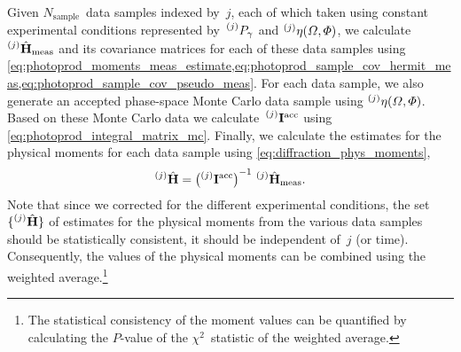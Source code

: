 Given $N_\text{sample}$~data samples indexed by~$j$, each of which
taken using constant experimental conditions represented
by~$\prescript{(j)}{}{P_\gamma}$ and $\prescript{(j)}{}{\eta}(\Omega,
\Phi)$, we calculate
$\prescript{(j)}{}{\vphantom{\vect{H}}}\hat{\vect{H}}_\text{meas}$ and
its covariance matrices for each of these data samples using
\cref{eq:photoprod_moments_meas_estimate,eq:photoprod_sample_cov_hermit_meas,eq:photoprod_sample_cov_pseudo_meas}.
For each data sample, we also generate an accepted phase-space Monte
Carlo data sample using $\prescript{(j)}{}{\eta}(\Omega, \Phi)$.
Based on these Monte Carlo data we
calculate~$\prescript{(j)}{}{\ensuremath{\bm{\mathrm{I}}}}^\text{acc}$ using
\cref{eq:photoprod_integral_matrix_mc}.  Finally, we calculate the
estimates for the physical moments for each data sample using
\cref{eq:diffraction_phys_moments}, \ie
\begin{equation}
  \prescript{(j)}{}{\vphantom{\vect{H}}}\hat{\vect{H}}
  = \rBrk[1]{\prescript{(j)}{}{\mat{I}}^\text{acc}}^{-1}\, \prescript{(j)}{}{\vphantom{\vect{H}}}\hat{\vect{H}}_\text{meas}.
\end{equation}
Note that since we corrected for the different experimental
conditions, the set
$\cBrk[0]{\prescript{(j)}{}{\vphantom{\vect{H}}}\hat{\vect{H}}}$ of
estimates for the physical moments from the various data samples
should be statistically consistent, \ie it should be independent
of~$j$ (or time).  Consequently, the values of the physical moments
can be combined using the weighted average.\footnote{The statistical
consistency of the moment values can be quantified by calculating the
$P$-value of the $\chi^2$~statistic of the weighted average.}
